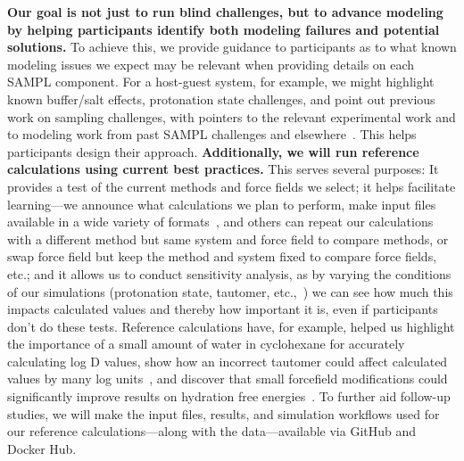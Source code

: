 \documentclass[11pt]{article}
\begin{document}
\textbf{Our goal is not just to run blind challenges, but to advance modeling by helping participants identify both modeling failures and potential solutions.} 
To achieve this, we provide guidance to participants as to what known modeling issues we expect may be relevant when providing details on each SAMPL component.
For a host-guest system, for example, we might highlight known buffer/salt effects, protonation state challenges, and point out previous work on sampling challenges, with pointers to the relevant experimental work and to modeling work from past SAMPL challenges and elsewhere~\cite{mobley_predicting_2016}.
This helps participants design their approach.
{\bf Additionally, we will run reference calculations using current best practices.} 
This serves several purposes:
It provides a test of the current methods and force fields we select; 
it helps facilitate learning---we announce what calculations we plan to perform, make input files available in a wide variety of formats~\cite{shirts_lessons_2016, yin_overview_2016, bannan_blind_2016}, and others can repeat our calculations with a different method but same system and force field to compare methods, or swap force field but keep the method and system fixed to compare force fields, etc.; 
and it allows us to conduct sensitivity analysis, as by varying the conditions of our simulations (protonation state, tautomer, etc.,~\cite{bannan_blind_2016}) we can see how much this impacts calculated values and thereby how important it is, even if participants don't do these tests.
Reference calculations have, for example, helped us highlight the importance of a small amount of water in cyclohexane for accurately calculating log D values, show how an incorrect tautomer could affect calculated values by many log units~\cite{bannan_blind_2016}, and discover that small forcefield modifications could significantly improve results on hydration free energies~\cite{mobley_blind_2014-1}.
To further aid follow-up studies, we will make the input files, results, and simulation workflows used for our reference calculations---along with the data---available via GitHub and Docker Hub.
\end{document}
